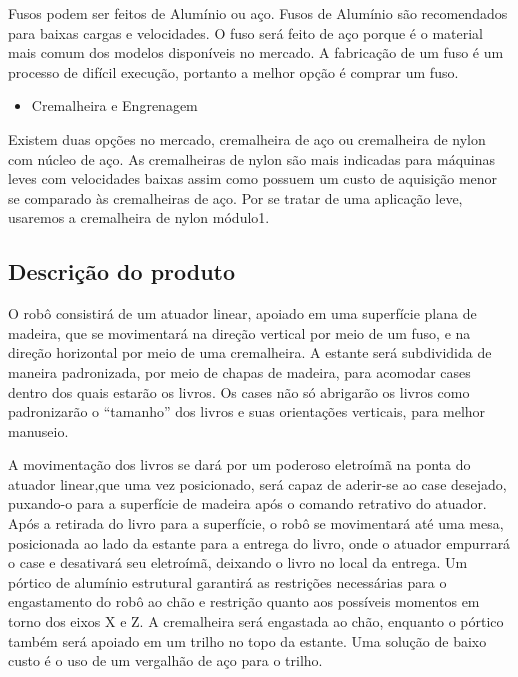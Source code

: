 Fusos podem ser feitos de Alumínio ou aço. Fusos de Alumínio são recomendados para  baixas cargas e velocidades. O fuso será feito de aço porque é o material mais comum dos modelos disponíveis no mercado. A fabricação de um fuso é um processo de difícil execução, portanto a melhor opção é comprar um fuso.

\begin{itemize}
\item{Cremalheira e Engrenagem}
\end{itemize}

Existem duas opções no mercado, cremalheira de aço ou cremalheira de nylon com núcleo de aço. As cremalheiras de nylon são mais indicadas para máquinas leves com velocidades baixas assim como possuem um custo de aquisição menor se comparado às cremalheiras de aço. Por se tratar de uma aplicação leve, usaremos a cremalheira de nylon módulo1.

\subsection{Descrição do produto}

O robô consistirá de um atuador linear, apoiado em uma superfície plana de madeira, que se movimentará na direção vertical por meio de um fuso, e na direção horizontal por meio de uma cremalheira. A estante será subdividida de maneira padronizada, por meio de chapas de madeira, para acomodar cases dentro dos quais estarão os livros. Os cases não só abrigarão os livros como padronizarão o “tamanho” dos livros e suas orientações verticais, para melhor manuseio.

 A movimentação dos livros se dará por um poderoso eletroímã na ponta do atuador linear,que uma vez posicionado, será capaz de aderir-se ao case desejado, puxando-o para a superfície de madeira após o comando retrativo do atuador. Após a retirada do livro para a superfície, o robô se movimentará até uma mesa, posicionada ao lado da estante para a entrega do livro, onde o atuador empurrará o case e desativará seu eletroímã, deixando o livro no local da entrega. Um pórtico de alumínio estrutural garantirá as restrições necessárias para o engastamento do robô ao chão e restrição quanto aos possíveis momentos em torno dos eixos X e Z. A cremalheira será engastada ao chão, enquanto o pórtico também será apoiado em um trilho no topo da estante. Uma solução de baixo custo é o uso de um vergalhão de aço para o trilho.

